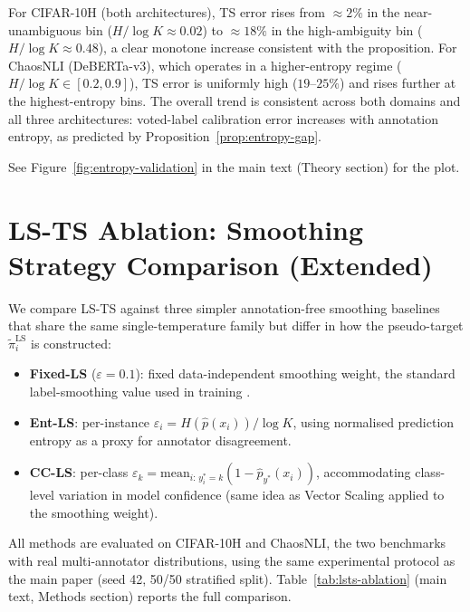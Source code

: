 \documentclass[10pt,journal,compsoc]{IEEEtran}
\newcommand{\tpihat}{\tilde{\pi}}
\begin{document}
For CIFAR-10H (both architectures), TS error rises from ${\approx}2\%$ in the near-unambiguous bin ($H/\log K \approx 0.02$) to ${\approx}18\%$ in the high-ambiguity bin ($H/\log K \approx 0.48$), a clear monotone increase consistent with the proposition.  For ChaosNLI (DeBERTa-v3), which operates in a higher-entropy regime ($H/\log K \in [0.2, 0.9]$), TS error is uniformly high ($19$--$25\%$) and rises further at the highest-entropy bins.  The overall trend is consistent across both domains and all three architectures: voted-label calibration error increases with annotation entropy, as predicted by Proposition~\ref{prop:entropy-gap}.

See Figure~\ref{fig:entropy-validation} in the main text (Theory section) for the plot.

\section{LS-TS Ablation: Smoothing Strategy Comparison (Extended)}
\label{app:lsts-ablation}

We compare LS-TS against three simpler annotation-free smoothing baselines that share the same single-temperature family but differ in how the pseudo-target $\tpihat^{\mathrm{LS}}_i$ is constructed:

\begin{itemize}[noitemsep, topsep=2pt]
  \item \textbf{Fixed-LS} ($\varepsilon{=}0.1$): fixed data-independent smoothing weight, the standard label-smoothing value used in training \cite{szegedy2016rethinking}.
  \item \textbf{Ent-LS}: per-instance $\varepsilon_i = H(\hat{p}(x_i)) / \log K$, using normalised prediction entropy as a proxy for annotator disagreement.
  \item \textbf{CC-LS}: per-class $\varepsilon_k = \mathrm{mean}_{i:\,y^*_i=k}(1 - \hat{p}_{y^*}(x_i))$, accommodating class-level variation in model confidence (same idea as Vector Scaling applied to the smoothing weight).
\end{itemize}

All methods are evaluated on CIFAR-10H and ChaosNLI, the two benchmarks with real multi-annotator distributions, using the same experimental protocol as the main paper (seed 42, 50/50 stratified split).  Table~\ref{tab:lsts-ablation} (main text, Methods section) reports the full comparison.
\end{document}
